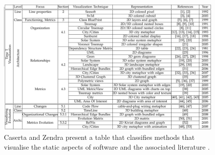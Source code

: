 \begin{figure}[t]
\begin{center}
\includegraphics[width=1\textwidth]{images/caserta2011visualization}
\caption{Caserta and Zendra present a table that classifies methods that visualise the static aspects of software and the associated literature \cite{caserta2011visualization} .} \label{fig: caserta2011visualization}
\end{center}
\end{figure}

%
%
%

